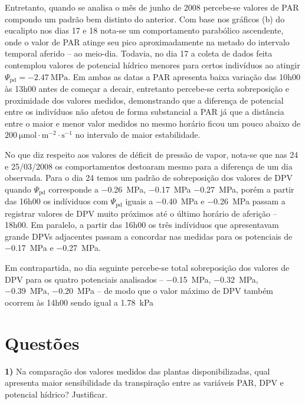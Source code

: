 \documentclass[a4paper, 12pt]{article}
\numberwithin{equation}{section}
\begin{document}
	Entretanto, quando se analisa o mês de junho de 2008 percebe-se valores de PAR compondo um padrão bem distinto do anterior. Com base nos gráficos (b) do eucalipto nos dias 17 e 18 nota-se um comportamento parabólico ascendente, onde o valor de PAR atinge seu pico aproximadamente na metado do intervalo temporal aferido -- ao meio-dia. Todavia, no dia 17 a coleta de dados feita contemplou valores de potencial hídrico menores para certos indivíduos ao atingir $\Psi_{\textrm{pd}}=\SI{-2.47}{\mega\pascal}$. Em ambas as datas a PAR apresenta baixa variação das 10h00 às 13h00 antes de começar a decair, entretanto percebe-se certa sobreposição e proximidade dos valores medidos, demonstrando que a diferença de potencial entre os indivíduos não afetou de forma substancial a PAR já que a distância entre o maior e menor valor medidos no mesmo horário ficou um pouco abaixo de $\SI{200}{\micro\mole\cdot\meter^{-2}\cdot\second^{-1}}$ no intervalo de maior estabilidade.
	
	No que diz respeito aos valores de déficit de pressão de vapor, nota-se que nas 24 e 25/03/2008 os comportamentos destoaram mesmo para a diferença de um dia observada. Para o dia 24 temos um padrão de sobreposição dos valores de DPV quando $\Psi_{\textrm{pd}}$ corresponde a \SI{-.26}{\mega\pascal}, \SI{-.17}{\mega\pascal} \SI{-.27}{\mega\pascal}, porém a partir das 16h00 os indíviduos com $\Psi_{\textrm{pd}}$ iguais a \SI{-.40}{\mega\pascal} e \SI{-.26}{\mega\pascal} passam a registrar valores de DPV muito próximos até o último horário de aferição -- 18h00. Em paralelo, a partir das 16h00 os três indíviduos que apresentavam grande DPVs adjacentes passam a concordar nas medidas para os potenciais de \SI{-.17}{\mega\pascal} e \SI{-.27}{\mega\pascal}.
	
	Em contrapartida, no dia seguinte percebe-se total sobreposição dos valores de DPV para os quatro potenciais analisados -- \SI{-.15}{\mega\pascal}, \SI{-.32}{\mega\pascal}, \SI{-.39}{\mega\pascal}, \SI{-.20}{\mega\pascal} -- de modo que o valor máximo de DPV também ocorrem às 14h00 sendo igual a \SI{1.78}{\kilo\pascal}
	
	
	\section{Questões}
	\noindent\textbf{1)} Na comparação dos valores medidos das plantas disponibilizadas, qual apresenta maior sensibilidade da transpiração entre as variáveis PAR, DPV e potencial hídrico? Justificar.\\
	
\end{document}
